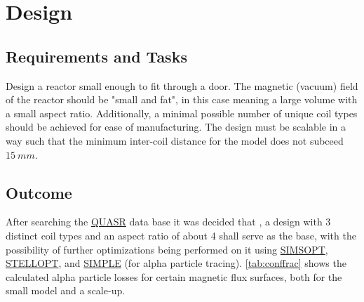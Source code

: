 \section{Design}
\subsection{Requirements and Tasks}
Design a reactor small enough to fit through a door.
The magnetic (vacuum) field of the reactor should be "small and fat", in this case meaning a large volume with a small aspect ratio.
Additionally, a minimal possible number of unique coil types should be achieved for ease of manufacturing.
The design must be scalable in a way such that the minimum inter-coil distance for the model does not subceed $15~\unit{mm}$.



\subsection{Outcome}
After searching the \href{https://quasr.flatironinstitute.org/}{QUASR} data base it was decided that \cite{QUASR}, a design with 3 distinct coil types and an aspect ratio of about 4 shall serve as the base, with the possibility of further optimizations being performed on it using \href{https://github.com/hiddenSymmetries/simsopt}{SIMSOPT}, \href{https://github.com/PrincetonUniversity/STELLOPT}{STELLOPT}, and \href{https://github.com/itpplasma/SIMPLE}{SIMPLE} (for alpha particle tracing).
\autoref{tab:conffrac} shows the calculated alpha particle losses for certain magnetic flux surfaces, both for the small model and a scale-up.

